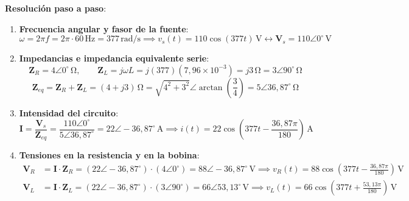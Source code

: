 \begin{ejercicio}
\textbf{Resolución paso a paso}:
\begin{enumerate}
    \item \textbf{Frecuencia angular y fasor de la fuente}:
    \begin{equation*}
        \omega = 2\pi f = 2\pi\cdot 60\,\si{\hertz} = 377\,\si{\radian/\second} \implies v_s(t) = 110\cos(377 t)\,\si{\volt} \longleftrightarrow \mathbf{V}_s = 110\angle 0^\circ\,\si{\volt}
    \end{equation*}
    \item \textbf{Impedancias e impedancia equivalente serie}:
    \begin{equation*}
        \mathbf{Z}_R = 4\angle 0^\circ\,\si{\ohm}, \qquad \mathbf{Z}_L = j\omega L = j(377)(7{,}96\times 10^{-3}) = j 3\,\si{\ohm} = 3\angle 90^\circ\,\si{\ohm}
    \end{equation*}
    \begin{equation*}
        \mathbf{Z}_{eq} = \mathbf{Z}_R + \mathbf{Z}_L = (4 + j 3)\,\si{\ohm} = \sqrt{4^2 + 3^2}\angle\arctan\left(\frac{3}{4}\right) = \boxed{5\angle 36{,}87^\circ\,\si{\ohm}}
    \end{equation*}
    \item \textbf{Intensidad del circuito}:
    \begin{equation*}
        \mathbf{I} = \frac{\mathbf{V}_s}{\mathbf{Z}_{eq}} = \frac{110\angle 0^\circ}{5\angle 36{,}87^\circ} = 22\angle -36{,}87^\circ\,\si{\ampere} \implies \boxed{i(t) = 22\cos\left(377 t - \frac{36{,}87\pi}{180}\right)\,\si{\ampere}}
    \end{equation*}
    \item \textbf{Tensiones en la resistencia y en la bobina}:
    \begin{align*}
        \mathbf{V}_R &= \mathbf{I}\cdot\mathbf{Z}_R = (22\angle -36{,}87^\circ)\cdot(4\angle 0^\circ) = 88\angle -36{,}87^\circ\,\si{\volt} \implies \boxed{v_R(t) = 88\cos\left(377 t - \frac{36{,}87\pi}{180}\right)\,\si{\volt}} \\
        \mathbf{V}_L &= \mathbf{I}\cdot\mathbf{Z}_L = (22\angle -36{,}87^\circ)\cdot(3\angle 90^\circ) = 66\angle 53{,}13^\circ\,\si{\volt} \implies \boxed{v_L(t) = 66\cos\left(377 t + \frac{53{,}13\pi}{180}\right)\,\si{\volt}}
    \end{align*}
\end{enumerate}
\end{ejercicio}

